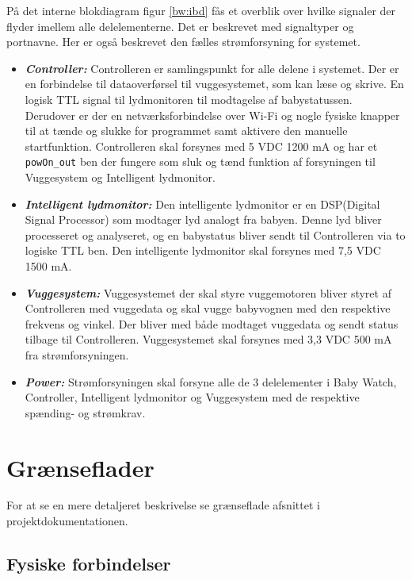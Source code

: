 På det interne blokdiagram figur \ref{bw:ibd} fås et overblik over hvilke signaler der flyder imellem alle delelementerne. Det er beskrevet med signaltyper og portnavne. Her er også beskrevet den fælles strømforsyning for systemet.


\begin{itemize}
\item \textbf{\textit{Controller:}}
Controlleren er samlingspunkt for alle delene i systemet. Der er en \iic forbindelse til dataoverførsel til vuggesystemet, som kan læse og skrive. En logisk TTL signal til lydmonitoren til modtagelse af babystatussen. Derudover er der en netværksforbindelse over Wi-Fi og nogle fysiske knapper til at tænde og slukke for programmet samt aktivere den manuelle startfunktion. Controlleren skal forsynes med 5 VDC 1200 mA og har et \verb+powOn_out+ ben der fungere som sluk og tænd funktion af forsyningen til Vuggesystem og Intelligent lydmonitor.
\item \textbf{\textit{Intelligent lydmonitor:}}
Den intelligente lydmonitor er en DSP(Digital Signal Processor) som modtager lyd analogt fra babyen. Denne lyd bliver processeret og analyseret, og en babystatus bliver sendt til Controlleren via to logiske TTL ben. Den intelligente lydmonitor skal forsynes med 7,5 VDC 1500 mA.
\item \textbf{\textit{Vuggesystem:}}
Vuggesystemet der skal styre vuggemotoren bliver styret af Controlleren med vuggedata og skal vugge babyvognen med den respektive frekvens og vinkel. Der bliver med \iic både modtaget vuggedata og sendt status tilbage til Controlleren. Vuggesystemet skal forsynes med 3,3 VDC 500 mA fra strømforsyningen.
\item \textbf{\textit{Power:}}
Strømforsyningen skal forsyne alle de 3 delelementer i Baby Watch, Controller, Intelligent lydmonitor og Vuggesystem med de respektive spænding- og strømkrav.
\end{itemize}

\section{Grænseflader}

For at se en mere detaljeret beskrivelse se grænseflade afsnittet i projektdokumentationen.

\subsection{Fysiske forbindelser}

